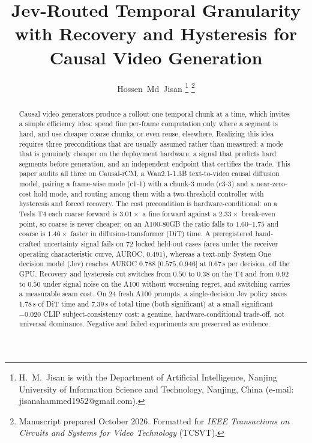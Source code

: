 \documentclass[journal]{IEEEtran}
\newcommand{\cfine}{\textup{c1-1}}
\newcommand{\ccoarse}{\textup{c3-3}}
\begin{document}
\title{Jev-Routed Temporal Granularity with Recovery and Hysteresis for Causal Video Generation}

\author{Hossen~Md~Jisan%
\thanks{H.~M.~Jisan is with the Department of Artificial Intelligence, Nanjing University of Information Science and Technology, Nanjing, China (e-mail: jisanahammed1952@gmail.com).}%
\thanks{Manuscript prepared October 2026. Formatted for \emph{IEEE Transactions on Circuits and Systems for Video Technology} (TCSVT).}}


\maketitle

\begin{abstract}
Causal video generators produce a rollout one temporal chunk at a time, which invites a simple efficiency idea: spend fine per-frame computation only where a segment is hard, and use cheaper coarse chunks, or even reuse, elsewhere. Realizing this idea requires three preconditions that are usually assumed rather than measured: a mode that is genuinely cheaper on the deployment hardware, a signal that predicts hard segments before generation, and an independent endpoint that certifies the trade. This paper audits all three on Causal-rCM, a Wan2.1-1.3B text-to-video causal diffusion model, pairing a frame-wise mode (\cfine) with a chunk-3 mode (\ccoarse) and a near-zero-cost hold mode, and routing among them with a two-threshold controller with hysteresis and forced recovery. The cost precondition is hardware-conditional: on a Tesla T4 each coarse forward is $3.01\times$ a fine forward against a $2.33\times$ break-even point, so coarse is never cheaper; on an A100-80GB the ratio falls to $1.60$--$1.75$ and coarse is $1.46\times$ faster in diffusion-transformer (DiT) time. A preregistered hand-crafted uncertainty signal fails on 72 locked held-out cases (area under the receiver operating characteristic curve, AUROC, $0.491$), whereas a text-only System One decision model (Jev) reaches AUROC $0.788$ [$0.575,0.946$] at $0.67$\,s per decision, off the GPU. Recovery and hysteresis cut switches from $0.50$ to $0.38$ on the T4 and from $0.92$ to $0.50$ under signal noise on the A100 without worsening regret, and switching carries a measurable seam cost. On 24 fresh A100 prompts, a single-decision Jev policy saves $1.78$\,s of DiT time and $7.39$\,s of total time (both significant) at a small significant $-0.020$ CLIP subject-consistency cost: a genuine, hardware-conditional trade-off, not universal dominance. Negative and failed experiments are preserved as evidence.
\end{abstract}
\end{document}
